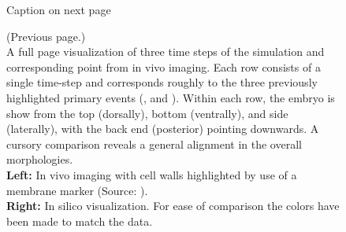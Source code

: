 \begin{figure}[H]
    \centering
    \vspace*{-1cm}\hspace*{-1cm}
    \caption{Caption on next page}
    \label{fig:big-visual-comparison}
\end{figure}
\newpage
\addtocounter{figure}{-1}
\begin{figure} [t!]
  \caption{(Previous page.) \\A full page visualization of three time steps of the simulation and corresponding point from in vivo imaging. 
  Each row consists of a single time-step and corresponds roughly to the three previously highlighted primary events (,  and ). Within each row, the embryo is show from the top (dorsally), bottom (ventrally), and side (laterally), with the back end (posterior) pointing downwards.
  A cursory comparison reveals a general alignment in the overall morphologies.\\
  \textbf{Left:} In vivo imaging with cell walls highlighted by use of a membrane marker (Source: ).\\ \textbf{Right:} In silico visualization. For ease of comparison the colors have been made to match the data.}
\end{figure}


